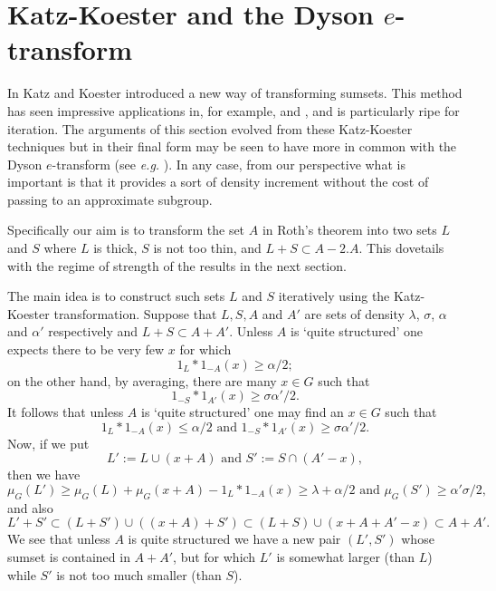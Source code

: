 \documentclass[12pt]{amsart}  %
\begin{document}
\section{Katz-Koester and the Dyson $e$-transform}\label{sec.kk}

In \cite{katkoe::} Katz and Koester introduced a new way of transforming sumsets.  This method has seen impressive applications in, for example, \cite{sch::1} and \cite{schshk::}, and is particularly ripe for iteration.  The arguments of this section evolved from these Katz-Koester techniques but in their final form may be seen to have more in common with the Dyson $e$-transform (see \emph{e.g.} \cite[\S 5.1]{taovu::}).  In any case, from our perspective what is important is that it provides a sort of density increment without the cost of passing to an approximate subgroup.

Specifically our aim is to transform the set $A$ in Roth's theorem into two sets $L$ and $S$ where $L$ is thick, $S$ is not too thin, and $L+S \subset A-2.A$.  This dovetails with the regime of strength of the results in the next section.

The main idea is to construct such sets $L$ and $S$ iteratively using the Katz-Koester transformation.  Suppose that $L,S,A$ and $A'$ are sets of density $\lambda$, $\sigma$, $\alpha$ and $\alpha'$ respectively and $L+S \subset A+A'$.  Unless $A$ is `quite structured' one expects there to be very few $x$ for which
\begin{equation*}
1_{L} \ast 1_{-A}(x) \geq \alpha/2;
\end{equation*}
on the other hand, by averaging, there are many $x \in G$ such that
\begin{equation*}
1_{-S}\ast 1_{A'}(x) \geq \sigma\alpha'/2.
\end{equation*}
It follows that unless $A$ is `quite structured' one may find an $x \in G$ such that
\begin{equation*}
1_L \ast 1_{-A}(x) \leq \alpha/2 \textrm{ and } 1_{-S}\ast 1_{A'}(x) \geq \sigma\alpha'/2.
\end{equation*}
Now, if we put 
\begin{equation*}
L':= L \cup (x+A) \textrm{ and } S':=S \cap (A'-x),
\end{equation*}
then we have
\begin{equation*}
\mu_G(L') \geq \mu_G(L) + \mu_G(x+A) - 1_L \ast 1_{-A}(x) \geq \lambda + \alpha/2 \textrm{ and } \mu_G(S') \geq \alpha'\sigma/2,
\end{equation*}
and also
\begin{equation*}
L'+S' \subset (L+S') \cup ((x+A) + S')\subset (L+S) \cup (x+A+A'-x) \subset A+A'.
\end{equation*}
We see that unless $A$ is quite structured we have a new pair $(L',S')$ whose sumset is contained in $A+A'$, but for which $L'$ is somewhat larger (than $L$) while $S'$ is not too much smaller (than $S$).
\end{document}
